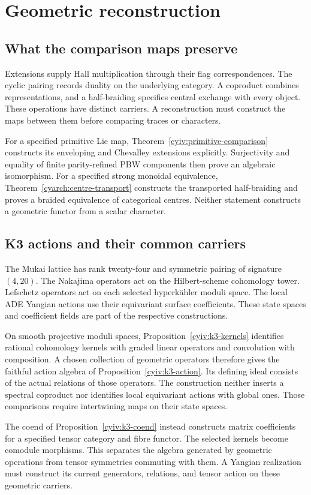 \part{Geometric reconstruction}
\chapter{What the comparison maps preserve}
Extensions supply Hall multiplication through their flag correspondences.
The cyclic pairing records duality on the underlying category.
A coproduct combines representations, and a half-braiding specifies
central exchange with every object.
These operations have distinct carriers.
A reconstruction must construct the maps between them before comparing
traces or characters.

For a specified primitive Lie map, Theorem~\ref{cyiv:primitive-comparison}
constructs its enveloping and Chevalley extensions explicitly.
Surjectivity and equality of finite parity-refined PBW components then
prove an algebraic isomorphism.
For a specified strong monoidal equivalence,
Theorem~\ref{cyarch:centre-transport} constructs the transported
half-braiding and proves a braided equivalence of categorical centres.
Neither statement constructs a geometric functor from a scalar character.

\chapter{K3 actions and their common carriers}
The Mukai lattice has rank twenty-four and symmetric pairing of signature
$(4,20)$.
The Nakajima operators act on the Hilbert-scheme cohomology tower.
Lefschetz operators act on each selected hyperk\"ahler moduli space.
The local ADE Yangian actions use their equivariant surface coefficients.
These state spaces and coefficient fields are part of the respective
constructions.

On smooth projective moduli spaces, Proposition~\ref{cyiv:k3-kernels}
identifies rational cohomology kernels with graded linear operators and
convolution with composition.
A chosen collection of geometric operators therefore gives the faithful
action algebra of Proposition~\ref{cyiv:k3-action}.
Its defining ideal consists of the actual relations of those operators.
The construction neither inserts a spectral coproduct nor identifies
local equivariant actions with global ones.
Those comparisons require intertwining maps on their state spaces.

The coend of Proposition~\ref{cyiv:k3-coend} instead constructs matrix
coefficients for a specified tensor category and fibre functor.
The selected kernels become comodule morphisms.
This separates the algebra generated by geometric operations from tensor
symmetries commuting with them.
A Yangian realization must construct its current generators, relations,
and tensor action on these geometric carriers.

